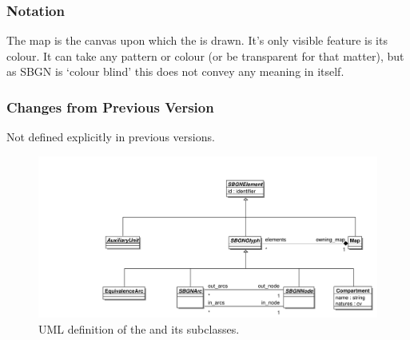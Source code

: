 \begin{valrules}
\end{valrules}


\subsubsection{Notation}

The map is the canvas upon which the \PDl is drawn. It's only visible
feature is its colour. It can take any pattern or colour (or be
transparent for that matter), but as SBGN is `colour blind' this does
not convey any meaning in itself.

\subsubsection{Changes from Previous Version}

Not defined explicitly in previous versions.

\label{defn:SBGNGlyph}

\begin{figure}[htb]
  \centering
  \includegraphics[width=\textwidth]{images/glyphauxuml}
\caption{UML definition of the  and its subclasses.}
  \label{fig:techref:glyphauxuml}
\end{figure}

